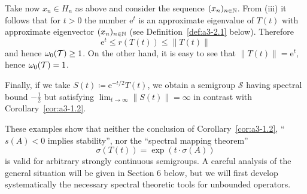 Take now $x_{n} \in H_{n}$ as above and consider the sequence $(x_{n})_{n \in \mathbb{N}}$.
From (iii) it follows that for $t > 0$ the number $\mathrm{e}^{t}$ is an approximate eigenvalue of $T(t)$ with approximate eigenvector $(x_{n})_{n \in \mathbb{N}}$ (see Definition~\ref{def:a3-2.1} below).
Therefore 
%
\[
	 \mathrm{e}^{t} \leq r(T(t)) \leq \|T(t)\|
\]
%
and hence $\omega_{0}(\mathcal{T}) \geq 1$.
On the other hand, it is easy to see that $\|T(t)\| = \mathrm{e}^{t}$, hence $\omega_{0}(\mathcal{T}) = 1$.


Finally, if we take $S(t) \coloneqq \mathrm{e}^{-t/2}T(t)$, we obtain a semigroup $\mathcal{S}$ 
having spectral bound $-\frac{1}{2}$ but satisfying $\lim_{t \to \infty} \|S(t)\| = \infty$ in contrast with Corollary~\ref{cor:a3-1.2}.

These examples show that neither the conclusion of Corollary~\ref{cor:a3-1.2}, \ie \enquote{$s(A) < 0$ implies stability}, nor the \enquote{spectral mapping theorem}
\[
    \sigma(T(t)) = \exp(t\cdot\sigma(A))
\]
is valid for arbitrary strongly continuous semigroups.
A careful analysis of the general situation will be given in Section 6 below, but we will first develop systematically the necessary spectral theoretic tools for unbounded operators.

